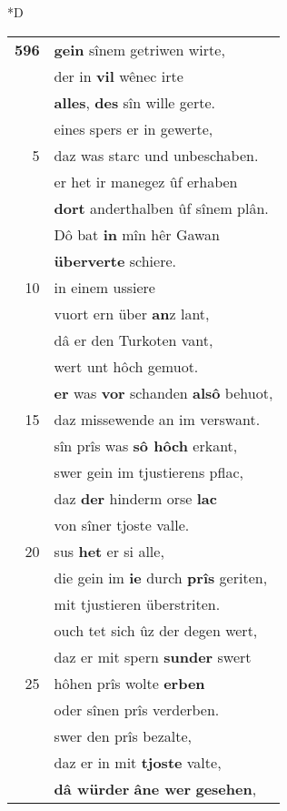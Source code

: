 \documentclass[8pt,a4paper,notitlepage]{article}
\begin{document}
\begin{table}[ht]
\begin{minipage}[t]{0.5\linewidth}
\small
\begin{center}*D
\end{center}
\begin{tabular}{rl}
\textbf{596} & \textbf{gein} sînem getriwen wirte,\\ 
 & der in \textbf{vil} wênec irte\\ 
 & \textbf{alles}, \textbf{des} sîn wille gerte.\\ 
 & eines spers er in gewerte,\\ 
5 & daz was starc und unbeschaben.\\ 
 & er het ir manegez ûf erhaben\\ 
 & \textbf{dort} anderthalben ûf sînem plân.\\ 
 & Dô bat \textbf{in} mîn hêr Gawan\\ 
 & \textbf{überverte} schiere.\\ 
10 & in einem ussiere\\ 
 & vuort ern über \textbf{an}z lant,\\ 
 & dâ er den Turkoten vant,\\ 
 & wert unt hôch gemuot.\\ 
 & \textbf{er} was \textbf{vor} schanden \textbf{alsô} behuot,\\ 
15 & daz missewende an im verswant.\\ 
 & sîn prîs was \textbf{sô hôch} erkant,\\ 
 & swer gein im tjustierens pflac,\\ 
 & daz \textbf{der} hinderm orse \textbf{lac}\\ 
 & von sîner tjoste valle.\\ 
20 & sus \textbf{het} er si alle,\\ 
 & die gein im \textbf{ie} durch \textbf{prîs} geriten,\\ 
 & mit tjustieren überstriten.\\ 
 & ouch tet sich ûz der degen wert,\\ 
 & daz er mit spern \textbf{sunder} swert\\ 
25 & hôhen prîs wolte \textbf{erben}\\ 
 & oder sînen prîs verderben.\\ 
 & swer den prîs bezalte,\\ 
 & daz er in mit \textbf{tjoste} valte,\\ 
 & \textbf{dâ würder} \textbf{âne wer} \textbf{gesehen},\\ 

\end{tabular}
\end{minipage}
\end{table}
\end{document}

